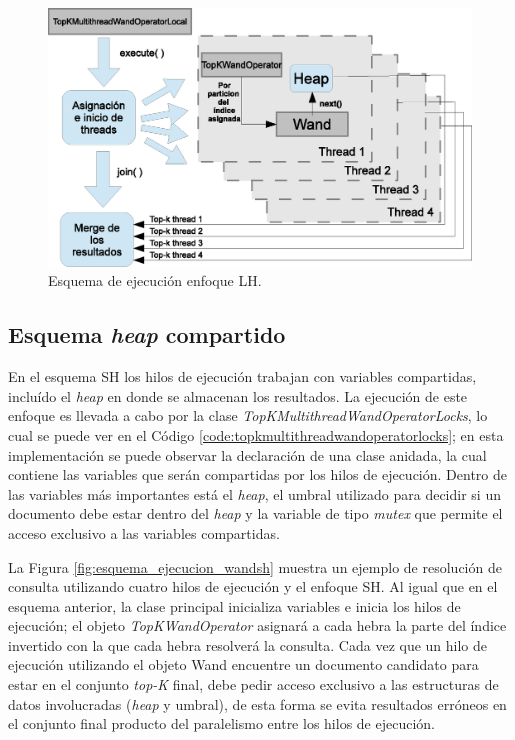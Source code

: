 \begin{figure}[tp]
\centering
\includegraphics[scale=.75]{images/ejecucion_topkmultithreadwandopLOCAL.eps}
\caption{Esquema de ejecución enfoque LH.}
\label{fig:esquema_ejecucion_wandlh}
\end{figure}

\subsection{Esquema \textit{heap} compartido}
\label{evaluacionexperimental:esquemash}
En el esquema SH los hilos de ejecución trabajan con variables compartidas, incluído el \textit{heap} en donde se almacenan los resultados. La ejecución de este enfoque es llevada a cabo por la clase \textit{TopKMultithreadWandOperatorLocks}, lo cual se puede ver en el Código \ref{code:topkmultithreadwandoperatorlocks}; en esta implementación se puede observar la declaración de una clase anidada, la cual contiene las variables que serán compartidas por los hilos de ejecución. Dentro de las variables más importantes está el \textit{heap}, el umbral utilizado para decidir si un documento debe estar dentro del \textit{heap} y la variable de tipo \textit{mutex} que permite el acceso exclusivo a las variables compartidas. 



La Figura \ref{fig:esquema_ejecucion_wandsh} muestra un ejemplo de resolución de consulta utilizando cuatro hilos de ejecución y el enfoque SH. Al igual que en el esquema anterior, la clase principal inicializa variables e inicia los hilos de ejecución; el objeto \textit{TopKWandOperator} asignará a cada hebra la parte del índice invertido con la que cada hebra resolverá la consulta. Cada vez que un hilo de ejecución utilizando el objeto Wand encuentre un documento candidato para estar en el conjunto \textit{top-K} final, debe pedir acceso exclusivo a las estructuras de datos involucradas (\textit{heap} y umbral), de esta forma se evita resultados erróneos en el conjunto final producto del paralelismo entre los hilos de ejecución.  

